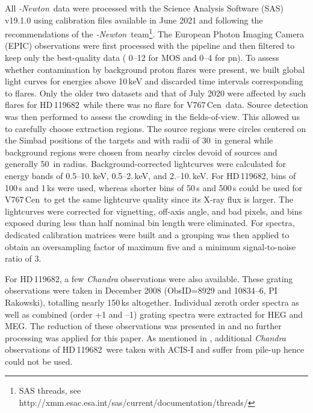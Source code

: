 \documentclass[a4paper,fleqn,usenatbib]{mnras}
\newcommand{\xmm}{{\sc{XMM}}\emph{-Newton}}
\newcommand{\hd}{HD\,119682}
\newcommand{\vc}{V767\,Cen}
\begin{document}
All \xmm\ data were processed with the Science Analysis Software (SAS) v19.1.0 using calibration files available in June 2021 and following the recommendations of the \xmm\ team\footnote{SAS threads, see \\ http://xmm.esac.esa.int/sas/current/documentation/threads/ }. The European Photon Imaging Camera (EPIC) observations were first processed with the pipeline and then filtered to keep only the best-quality data ({} 0--12 for MOS and 0--4 for pn). To assess whether contamination by background proton flares were present, we built global light curves for energies above 10\,keV and discarded time intervals corresponding to flares. Only the older two datasets and that of July 2020 were affected by such flares for \hd\ while there was no flare for \vc\ data. Source detection was then performed to assess the crowding in the fields-of-view. This allowed us to carefully choose extraction regions. The source regions were circles centered on the Simbad positions of the targets and with radii of 30\arcsec\ in general while background regions were chosen from nearby circles devoid of sources and generally 50\arcsec\ in radius. Background-corrected lightcurves were calculated for energy bands of 0.5--10.\,keV, 0.5--2.\,keV, and 2.--10.\,keV. For \hd, bins of 100\,s and 1\,ks were used, whereas shorter bins of 50\,s and 500\,s could be used for \vc\ to get the same lightcurve quality since its X-ray flux is larger. The lightcurves were corrected for vignetting, off-axis angle, and bad pixels, and bins exposed during less than half nominal bin length were eliminated. For spectra, dedicated calibration matrices were built and a grouping was then applied to obtain an oversampling factor of maximum five and a minimum signal-to-noise ratio of 3. 

For \hd, a few {\it Chandra} observations were also available. These grating observations were taken in December 2008 (ObsID=8929 and 10834--6, PI Rakowski), totalling nearly 150\,ks altogether. Individual zeroth order spectra as well as combined (order +1 and --1) grating spectra were extracted for HEG and MEG. The reduction of these observations was presented in \citet{naz18} and no further processing was applied for this paper. As mentioned in \citet{naz18}, additional {\it Chandra} observations of \hd\ were taken with ACIS-I and suffer from pile-up hence could not be used.
\end{document}
